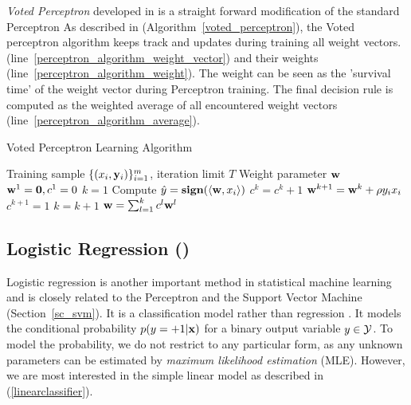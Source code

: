 \textit{Voted Perceptron} developed in \citep{Freund99} is a straight forward modification of the standard Perceptron
As described in (Algorithm~\ref{voted_perceptron}), the Voted perceptron algorithm keeps track and updates during training all weight vectors. (line~\ref{perceptron_algorithm_weight_vector}) and their weights (line~\ref{perceptron_algorithm_weight}).
The weight can be seen as the 'survival time' of the weight vector during Perceptron training.
The final decision rule is computed as the weighted average of all encountered weight vectors (line~\ref{perceptron_algorithm_average}).
\begin{algorithm}
\caption{Voted Perceptron Learning Algorithm}
\label{voted_perceptron}
\begin{algorithmic}[1]
	\REQUIRE Training sample $\lbrace (x_i,\mathbf {y}_i)\rbrace_{i=1}^m$, iteration limit $T$
	\ENSURE Weight parameter $\mathbf {w}$
	\STATE $\mathbf {w}^{1}=\mathbf {0},c^1=0$
	\STATE $k=1$
			\STATE Compute $\hat{y} = \textbf{sign}(\langle \mathbf {w}, x_i \rangle)$
				\STATE $c^k = c^k + 1$
			\ELSE
				\STATE $\mathbf {w}^{k+1} = \mathbf {w}^{k} + \rho y_ix_i$ \label{perceptron_algorithm_weight_vector}
				\STATE $c^{k+1} =1$ \label{perceptron_algorithm_weight}
				\STATE $k=k+1$
			\ENDIF
		\ENDFOR
	\ENDFOR
	\RETURN $\mathbf {w} = \sum_{l=1}^{k}c^l\mathbf {w}^{l}$ \label{perceptron_algorithm_average}
\end{algorithmic}
\end{algorithm}


%
\subsection{Logistic Regression (\lr)}

Logistic regression is another important method in statistical machine learning and is closely related to the Perceptron and the Support Vector Machine (Section~\ref{sc_svm}).
It is a classification model rather than regression \citep{Bishop07}.
It models the conditional probability $p(y=+1|\mathbf {x})$ for a binary output variable $y\in\mathcal{Y}$.
To model the probability, we do not restrict to any particular form, as any unknown parameters can be estimated by \textit{maximum likelihood estimation} (MLE).
However, we are most interested in the simple linear model as described in (\ref{linearclassifier}).

